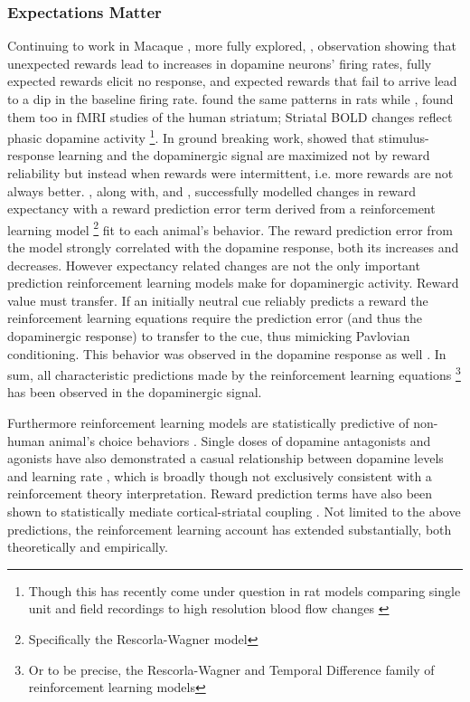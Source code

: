 \documentclass[doc,12pt]{apa}        %
\begin{document}
\subsubsection{Expectations Matter} %
\label{subsub:expectations}
Continuing to work in Macaque , more fully explored, , observation showing that unexpected rewards lead to increases in dopamine neurons' firing rates, fully expected rewards elicit no response, and expected rewards that fail to arrive lead to a dip in the baseline firing rate.    found the same patterns in rats while , found them too in fMRI studies of the human striatum; Striatal BOLD changes reflect phasic dopamine activity \cite{Schonberg:2009p6669,Surmeier:2007p4435}
\footnote{
    Though this has recently come under question in rat models comparing single unit and field recordings to high resolution blood flow changes \cite{Mishra:2011p9095}}. In ground breaking work,  showed that stimulus-response learning and the dopaminergic signal are maximized not by reward reliability but instead when rewards were intermittent, i.e. more rewards are not always better.  , along with,  and , successfully modelled changes in reward expectancy with a reward prediction error term derived from a reinforcement learning model
\footnote{
    Specifically the Rescorla-Wagner model
} fit to each animal's behavior. The reward prediction error from the model strongly correlated with the dopamine response, both its increases and decreases. However expectancy related changes are not the only important prediction reinforcement learning models make for dopaminergic activity.  Reward value must transfer.  If an initially neutral cue reliably predicts a reward the reinforcement learning equations require the prediction error (and thus the dopaminergic response) to transfer to the cue, thus mimicking Pavlovian conditioning.  This behavior was observed in the dopamine response as well \cite{Roesch:2007p2519, McClure:2003p3346}.  In sum, all characteristic predictions made by the reinforcement learning equations
\footnote{Or to be precise, the Rescorla-Wagner and Temporal Difference family of reinforcement learning models} has been observed in the dopaminergic signal.

Furthermore reinforcement learning models are statistically predictive of non-human animal's choice behaviors \cite{Hampton:2007p2983}.  Single doses of dopamine antagonists and agonists have also demonstrated a casual relationship between dopamine levels and learning rate \cite{Pizzagalli:2008p6521, Diaconescu:2010p7631}, which is broadly though not exclusively consistent with a reinforcement theory interpretation.  Reward prediction terms have also been shown to statistically mediate cortical-striatal coupling \cite{denOuden:2010p7203}.  Not limited to the above predictions, the reinforcement learning account has extended substantially, both theoretically and empirically.
\end{document}
